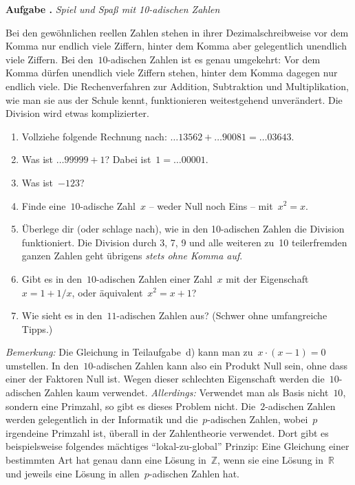 \documentclass[a4paper,ngerman,twoside]{scrartcl}
\newlength{\aufgabenskip}
\newcounter{aufgabennummer}
\newenvironment{aufgabe}[1]{
  \addtocounter{aufgabennummer}{1}
  \textbf{Aufgabe \theaufgabennummer.} \emph{#1} \par
}{\vspace{\aufgabenskip}}
\begin{document}
\begin{aufgabe}{Spiel und Spaß mit 10-adischen Zahlen}
Bei den gewöhnlichen reellen Zahlen stehen in ihrer Dezimalschreibweise vor dem
Komma nur endlich viele Ziffern, hinter dem Komma aber gelegentlich unendlich
viele Ziffern. Bei den~$10$-adischen Zahlen ist es genau umgekehrt: Vor dem
Komma dürfen unendlich viele Ziffern stehen, hinter dem Komma dagegen nur
endlich viele. Die Rechenverfahren zur Addition, Subtraktion und
Multiplikation, wie man sie aus der Schule kennt, funktionieren weitestgehend
unverändert. Die Division wird etwas komplizierter.
\begin{enumerate}
\item Vollziehe folgende Rechnung nach:
$\ldots 13562 + \ldots 90081 = \ldots 03643$.
\item Was ist $\ldots 99999 + 1$? Dabei ist~$1 = \ldots 00001$.
\item Was ist~$-123$?
\item Finde eine~$10$-adische Zahl~$x$ -- weder Null noch Eins -- mit~$x^2 = x$.
\item Überlege dir (oder schlage nach), wie in den 10-adischen Zahlen die
Division funktioniert. Die Division durch 3, 7, 9 und alle weiteren zu~10
teilerfremden ganzen Zahlen geht übrigens \emph{stets ohne Komma auf}.
\item Gibt es in den~$10$-adischen Zahlen einer Zahl~$x$ mit der
Eigenschaft~$x = 1 + 1/x$, oder äquivalent~$x^2 = x + 1$?
\item Wie sieht es in den~$11$-adischen Zahlen aus? (Schwer ohne umfangreiche
Tipps.)
\end{enumerate}
{\scriptsize
\emph{Bemerkung:} Die Gleichung in Teilaufgabe~d) kann man zu~$x \cdot (x-1) =
0$ umstellen. In den~$10$-adischen Zahlen kann also ein Produkt Null sein, ohne
dass einer der Faktoren Null ist. Wegen dieser schlechten Eigenschaft werden
die~$10$-adischen Zahlen kaum verwendet. \emph{Allerdings:} Verwendet man als
Basis nicht~$10$, sondern eine Primzahl, so gibt es dieses Problem nicht.
Die~$2$-adischen Zahlen werden gelegentlich in der Informatik und
die~$p$-adischen Zahlen, wobei~$p$ irgendeine Primzahl ist, überall in der
Zahlentheorie verwendet. Dort gibt es beispielsweise folgendes mächtiges
"`lokal-zu-global"' Prinzip: Eine Gleichung einer bestimmten Art hat genau dann
eine Lösung in~$\mathbb{Z}$, wenn sie eine Lösung in~$\mathbb{R}$ und jeweils
eine Lösung in allen~$p$-adischen Zahlen hat.\par}
\end{aufgabe}
\end{document}
